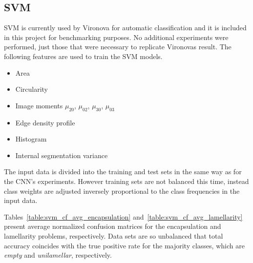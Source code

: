 \documentclass[a4paper, 11pt, table]{article}
\begin{document}
%

\subsection{SVM}
SVM is currently used by Vironova for automatic classification and it is included in this project for benchmarking purposes. No additional experiments were performed, just those that were necessary to replicate Vironovas result. 
The following features are used to train the SVM models.
\begin{itemize}
\item Area
\item Circularity
\item Image moments $\mu_{20}$, $\mu_{02}$, $\mu_{30}$, $\mu_{03}$
\item Edge density profile
\item Histogram
\item Internal segmentation variance
\end{itemize}

The input data is divided into the training and test sets in the same way as for the CNN's experiments. However training sets are not balanced this time, instead class weights are adjusted inversely proportional to the class frequencies in the input data.

Tables~\ref{table:svm_cf_avg_encapsulation} and~\ref{table:svm_cf_avg_lamellarity} present average normalized confusion matrices for the encapsulation and lamellarity problems, respectively. Data sets are so unbalanced that total accuracy coincides with the true positive rate for the majority classes, which are \textit{empty} and \textit{unilamellar}, respectively. 
\end{document}
